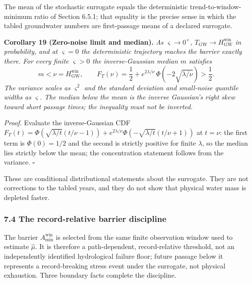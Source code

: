\documentclass[11pt]{article}
\begin{document}
The mean of the stochastic surrogate equals the deterministic
trend-to-window-minimum ratio of Section 6.5.1; that equality is the
precise sense in which the tabled groundwater numbers are first-passage
means of a declared surrogate.

\textbf{Corollary 19 (Zero-noise limit and median).} \emph{As
\(\varsigma \to 0^+\),
\(T_{\mathrm{GW}} \to H^{\mathrm{win}}_{\mathrm{GW}}\) in probability,
and at \(\varsigma = 0\) the deterministic trajectory reaches the
barrier exactly there. For every finite \(\varsigma > 0\) the
inverse-Gaussian median \(m\) satisfies}
\[m < \nu = H^{\mathrm{win}}_{\mathrm{GW}}, \qquad F_T(\nu) = \frac{1}{2} + e^{2\lambda/\nu}\,\Phi\!\left( -2\sqrt{\lambda/\nu} \right) > \frac{1}{2}.\]
\emph{The variance scales as \(\varsigma^2\) and the standard deviation
and small-noise quantile widths as \(\varsigma\). The median below the
mean is the inverse Gaussian's right skew toward short passage times;
the inequality must not be inverted.}

\emph{Proof.} Evaluate the inverse-Gaussian CDF
\(F_T(t) = \Phi(\sqrt{\lambda/\allowbreak{}t}(t/\nu - 1)) + e^{2\lambda/\nu}\Phi(-\sqrt{\lambda/\allowbreak{}t}(t/\nu + 1))\)
at \(t = \nu\): the first term is \(\Phi(0) = 1/\allowbreak{}2\) and the second is
strictly positive for finite \(\lambda\), so the median lies strictly
below the mean; the concentration statement follows from the variance. \ensuremath{\square}

These are conditional distributional statements about the surrogate.
They are not corrections to the tabled years, and they do not show that
physical water mass is depleted faster.

\subsubsection{7.4 The record-relative barrier
discipline}\label{the-record-relative-barrier-discipline}

The barrier \(A_{\min}^{\mathrm{win}}\) is selected from the same finite
observation window used to estimate \(\widehat\mu\). It is therefore a
path-dependent, record-relative threshold, not an independently
identified hydrological failure floor; future passage below it
represents a record-breaking stress event under the surrogate, not
physical exhaustion. Three boundary facts complete the discipline.
\end{document}
